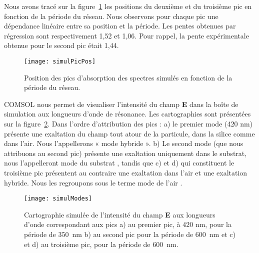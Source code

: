 Nous avons tracé sur la figure~\ref{simulPicPos} les positions du deuxième et du troisième pic en fonction de la période du réseau. Nous observons pour chaque pic une dépendance linéaire entre sa position et la période. Les pentes obtenues par régression sont respectivement 1,52 et 1,06. Pour rappel, la pente expérimentale obtenue pour le second pic était 1,44.\par 
\begin{figure}[!htb]
\centering
\texttt{[image: simulPicPos]}
\caption{Position des pics d’absorption des spectres simulés en fonction de la période du réseau.}
\label{simulPicPos}
\end{figure}

COMSOL nous permet de visualiser l’intensité du champ \textbf{E} dans la boîte de simulation aux longueurs d’onde de résonance. Les cartographies sont présentées sur la figure~\ref{simulModes}. Dans l’ordre d’attribution des pics : a) le premier mode (420 nm) présente une exaltation du champ tout atour de la particule, dans la silice comme dans l’air. Nous l’appellerons « mode hybride ». b) Le second mode (que nous attribuons au second pic) présente une exaltation uniquement dans le substrat, nous l'appelleront \og mode du substrat \fg, tandis que c) et d) qui constituent le troisième pic présentent au contraire une exaltation dans l’air et une exaltation hybride. Nous les regroupons sous le terme \og mode de l'air \fg.\par 
\begin{figure}[!htb]
\centering
\texttt{[image: simulModes]}
\caption{Cartographie simulée de l’intensité du champ \textbf{E} aux longueurs d’onde correspondant aux pics a) au premier pic, à 420 nm, pour la période de 350~nm b) au second pic pour la période de 600~nm et c) et d) au troisième pic, pour la période de 600~nm.}
\label{simulModes}
\end{figure}

